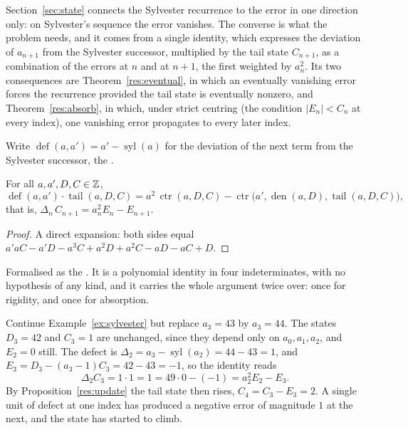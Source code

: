 \documentclass[11pt]{article}
\newcommand{\sylnext}{\operatorname{syl}}
\newcommand{\den}{\operatorname{den}}
\newcommand{\tail}{\operatorname{tail}}
\newcommand{\ctr}{\operatorname{ctr}}
\newcommand{\defect}{\operatorname{def}}
\begin{document}
Section~\ref{sec:state} connects the Sylvester recurrence to the error in one
direction only: on Sylvester's sequence the error vanishes.  The converse is
what the problem needs, and it comes from a single identity, which expresses
the deviation of $a_{n+1}$
from the Sylvester successor, multiplied by the tail state $C_{n+1}$, as a
combination of the errors at $n$ and at $n+1$, the first weighted by
$a_n^{2}$.  Its two consequences are
Theorem~\ref{res:eventual}, in which an eventually vanishing error forces the
recurrence provided the tail state is eventually nonzero, and
Theorem~\ref{res:absorb}, in which, under strict centring (the condition
$|E_n|<C_n$ at every index), one vanishing error propagates to every later
index.

Write $\defect(a,a')=a'-\sylnext(a)$ for the deviation of the next term from
the Sylvester successor, the
.

\begin{theorem}\label{res:defect}
For all $a,a',D,C\in\mathbb{Z}$,
\[
 \defect(a,a')\cdot\tail(a,D,C)
 =a^{2}\,\ctr(a,D,C)-\ctr\bigl(a',\den(a,D),\tail(a,D,C)\bigr),
\]
that is, $\Delta_n\,C_{n+1}=a_n^{2}E_n-E_{n+1}$.
\end{theorem}

\begin{proof}
A direct expansion: both sides equal
$a'aC-a'D-a^{3}C+a^{2}D+a^{2}C-aD-aC+D$.
\end{proof}

\noindent Formalised as the
.  It is a polynomial identity in four indeterminates, with no
hypothesis of any kind, and it carries the whole argument twice over: once for
rigidity, and once for absorption.

\begin{example}\label{ex:defect}
Continue Example~\ref{ex:sylvester} but replace $a_3=43$ by $a_3=44$.  The
states $D_3=42$ and $C_3=1$ are unchanged, since they depend only on
$a_0,a_1,a_2$, and $E_2=0$ still.  The defect is
$\Delta_2=a_3-\sylnext(a_2)=44-43=1$, and
$E_3=D_3-(a_3-1)C_3=42-43=-1$, so the identity reads
\[
 \Delta_2C_3=1\cdot1=1=49\cdot0-(-1)=a_2^{2}E_2-E_3 .
\]
By Proposition~\ref{res:update} the tail state then rises, $C_4=C_3-E_3=2$.  A
single unit of defect at one index has produced a negative error of magnitude
$1$ at the next, and the state has started to climb.
\end{example}
\end{document}
